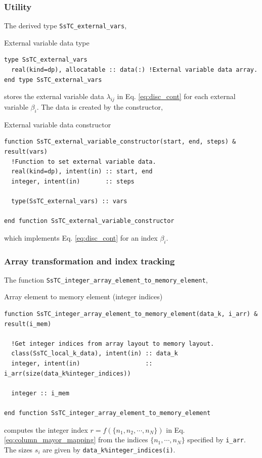 \documentclass[10pt,a4paper]{article}
\begin{document}
\subsubsection{Utility}
The derived type \verb|SsTC_external_vars|,
\begin{codebox}{External variable data type}
\begin{lstlisting}[caption={Derived type ``external variables".},captionpos=b]
type SsTC_external_vars
  real(kind=dp), allocatable :: data(:) !External variable data array.
end type SsTC_external_vars
\end{lstlisting}
\end{codebox}
stores the external variable data $\lambda_{ij}$ in Eq. \eqref{eq:disc_cont} for each external variable $\beta_i$. The data is created by the constructor,
\begin{codebox}{External variable data constructor}
\begin{lstlisting}[caption={Interface of ``external variable constructor".},captionpos=b]
function SsTC_external_variable_constructor(start, end, steps) &
result(vars)
  !Function to set external variable data.
  real(kind=dp), intent(in) :: start, end
  integer, intent(in)       :: steps

  type(SsTC_external_vars) :: vars
  
end function SsTC_external_variable_constructor
\end{lstlisting}
\end{codebox}
which implements Eq. \eqref{eq:disc_cont} for an index $\beta_i$.
\subsubsection{Array transformation and index tracking}

The function \verb|SsTC_integer_array_element_to_memory_element|,
\begin{codebox}{Array element to memory element (integer indices)}
\begin{lstlisting}[caption={Interface of ``integer array element to memory element".},captionpos=b]
function SsTC_integer_array_element_to_memory_element(data_k, i_arr) &
result(i_mem)

  !Get integer indices from array layout to memory layout.
  class(SsTC_local_k_data), intent(in) :: data_k
  integer, intent(in)                  :: i_arr(size(data_k%integer_indices))

  integer :: i_mem
  
end function SsTC_integer_array_element_to_memory_element
\end{lstlisting}
\end{codebox}
computes the integer index $r = f(\{n_1, n_2, \cdots, n_N\})$ in Eq. \eqref{eq:column_mayor_mapping} from the indices $\{n_1, \cdots, n_N\}$ specified by \verb|i_arr|. The sizes $s_i$ are given by \verb|data_k%integer_indices(i)|.
\end{document}
